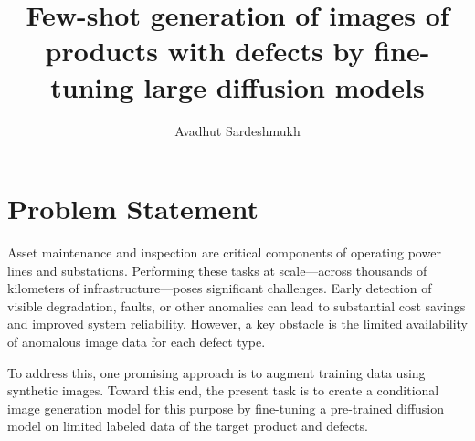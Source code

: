 \documentclass[]{article}
\title{Few-shot generation of images of products with defects by fine-tuning large diffusion models}
\author{Avadhut Sardeshmukh}
\begin{document}
\maketitle

\section{Problem Statement}
Asset maintenance and inspection are critical components of operating power lines and substations. Performing these tasks at scale—across thousands of kilometers of infrastructure—poses significant challenges. Early detection of visible degradation, faults, or other anomalies can lead to substantial cost savings and improved system reliability. However, a key obstacle is the limited availability of anomalous image data for each defect type. 

To address this, one promising approach is to augment training data using synthetic images. Toward this end, the present task is to create a conditional image generation model for this purpose by fine-tuning a pre-trained diffusion model on limited labeled data of the target product and defects. 
\end{document}
